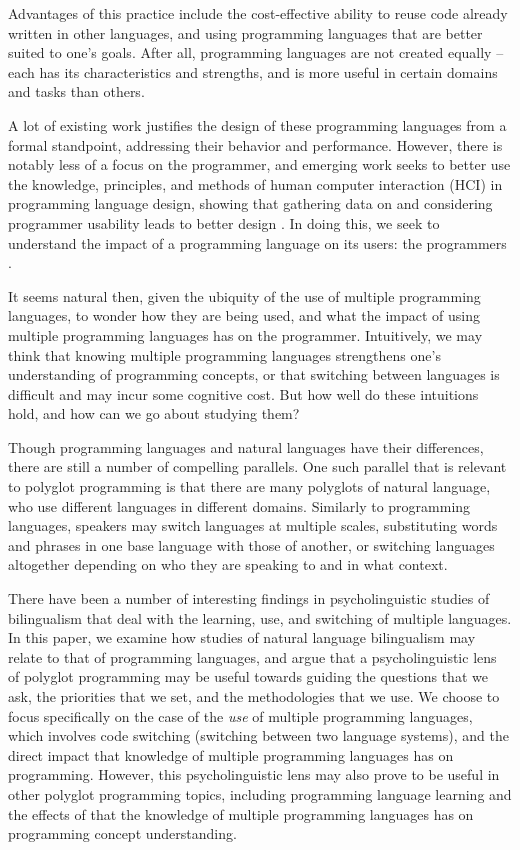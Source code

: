 \documentclass[a4paper,UKenglish,cleveref, autoref]{oasics-v2019}
\begin{document}
Advantages of this practice include the cost-effective ability to reuse code already written in other languages, and using programming languages that are better suited to one’s goals. After all, programming languages are not created equally -- each has its characteristics and strengths, and is more useful in certain domains and tasks than others. 

A lot of existing work justifies the design of these programming languages from a formal standpoint, addressing their behavior and performance. However, there is notably less of a focus on the programmer, and emerging work seeks to better use the knowledge, principles, and methods of human computer interaction (HCI) in programming language design, showing that gathering data on and considering programmer usability leads to better design \cite{pl0017, pl0027}. In doing this, we seek to understand the impact of a programming language on its users: the programmers \cite{pl0017}. 

It seems natural then, given the ubiquity of the use of multiple programming languages, to wonder how they are being used, and what the impact of using multiple programming languages has on the programmer. Intuitively, we may think that knowing multiple programming languages strengthens one’s understanding of programming concepts, or that switching between languages is difficult and may incur some cognitive cost. But how well do these intuitions hold, and how can we go about studying them? 

Though programming languages and natural languages have their differences, there are still a number of compelling parallels. One such parallel that is relevant to polyglot programming is that there are many polyglots of natural language, who use different languages in different domains. Similarly to programming languages, speakers may switch languages at multiple scales, substituting words and phrases in one base language with those of another, or switching languages altogether depending on who they are speaking to and in what context. 

There have been a number of interesting findings in psycholinguistic studies of bilingualism that deal with the learning, use, and switching of multiple languages. In this paper, we examine how studies of natural language bilingualism may relate to that of programming languages, and argue that a psycholinguistic lens of polyglot programming may be useful towards guiding the questions that we ask, the priorities that we set, and the methodologies that we use. We choose to focus specifically on the case of the \textit{use} of multiple programming languages, which involves code switching (switching between two language systems), and the direct impact that knowledge of multiple programming languages has on programming. However, this psycholinguistic lens may also prove to be useful in other polyglot programming topics, including programming language learning and the effects of that the knowledge of multiple programming languages has on programming concept understanding. 
\end{document}
